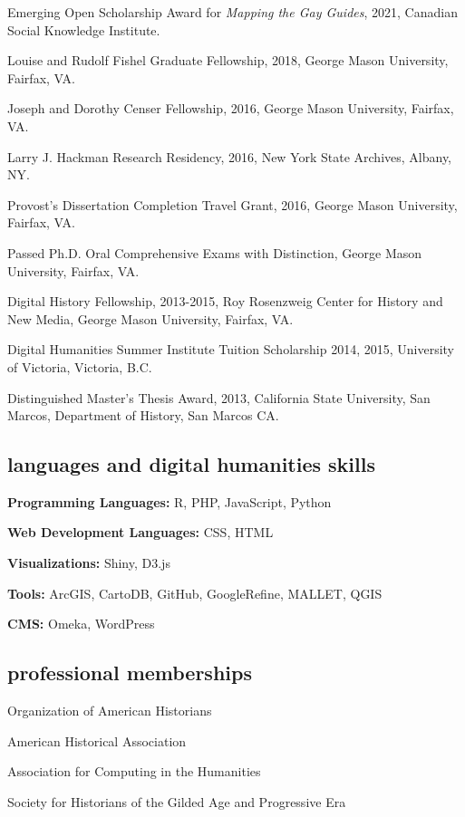 \documentclass[11pt]{article}
\begin{document}
Emerging Open Scholarship Award for \emph{Mapping the Gay Guides}, 2021, Canadian Social Knowledge Institute.

Louise and Rudolf Fishel Graduate Fellowship, 2018, George Mason University, Fairfax, VA.

Joseph and Dorothy Censer Fellowship, 2016, George Mason University, Fairfax, VA.

Larry J. Hackman Research Residency, 2016, New York State Archives, Albany, NY.

Provost's Dissertation Completion Travel Grant, 2016, George Mason University, Fairfax, VA.

Passed Ph.D. Oral Comprehensive Exams with Distinction, George Mason University, Fairfax, VA.

Digital History Fellowship, 2013-2015, Roy Rosenzweig Center for History and New Media, George Mason University, Fairfax, VA.

Digital Humanities Summer Institute Tuition Scholarship 2014, 2015, University of Victoria, Victoria, B.C.

Distinguished Master's Thesis Award, 2013, California State University, San Marcos, Department of History, San Marcos CA.


\subsection{languages and digital humanities skills}
\textbf{Programming Languages:} R, PHP, JavaScript, Python

\textbf{Web Development Languages:} CSS, HTML

\textbf{Visualizations:} Shiny, D3.js

\textbf{Tools:} ArcGIS, CartoDB, GitHub, GoogleRefine, MALLET, QGIS

\textbf{CMS:} Omeka, WordPress

\subsection{professional memberships}
Organization of American Historians

American Historical Association

Association for Computing in the Humanities

Society for Historians of the Gilded Age and Progressive Era
\end{document}
